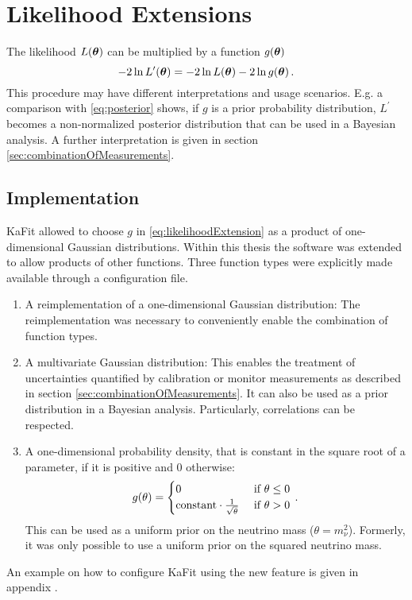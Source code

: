 \section{Likelihood Extensions}
The likelihood $L(\boldsymbol{\mathbf{\theta}})$ can be multiplied by a function $g(\boldsymbol{\mathbf{\theta}})$
\begin{equation}
	\label{eq:likelihoodExtension}
	-2\ln L^\prime(\boldsymbol{\mathbf{\theta}}) = -2\ln L(\boldsymbol{\mathbf{\theta}}) -2\ln g(\boldsymbol{\mathbf{\theta}})
	\text{\,.}
\end{equation}
This procedure may have different interpretations and usage scenarios. E.g. a comparison with \eqref{eq:posterior} shows, if $g$ is a prior probability distribution, $L^\prime$ becomes a non-normalized posterior distribution that can be used in a Bayesian analysis. A further interpretation is given in section \ref{sec:combinationOfMeasurements}. 

\subsection{Implementation}
KaFit allowed to choose $g$ in \ref{eq:likelihoodExtension} as a product of one-dimensional Gaussian distributions. Within this thesis the software was extended to allow products of other functions. Three function types were explicitly made available through a configuration file.
\begin{enumerate}
	\item A reimplementation of a one-dimensional Gaussian distribution: The reimplementation was necessary to conveniently enable the combination of function types.
	\item A multivariate Gaussian distribution: This enables the treatment of uncertainties quantified by calibration or monitor measurements as described in section \ref{sec:combinationOfMeasurements}. It can also be used as a prior distribution in a Bayesian analysis. Particularly, correlations can be respected.
	\item A one-dimensional probability density, that is constant in the square root of a parameter, if it is positive and 0 otherwise:
	\begin{equation}
		g(\theta) =
		\begin{cases}
		0 &\text{ if } \theta \leq 0 \\
		\text{constant} \cdot \frac{1}{\sqrt{\theta}} &\text{ if } \theta > 0
		\end{cases}
		\text{\,.}
	\end{equation}
	 This can be used as a uniform prior on the neutrino mass ($\theta=m_\nu^2$). Formerly, it was only possible to use a uniform prior on the squared neutrino mass.
\end{enumerate}
An example on how to configure KaFit using the new feature is given in appendix .

